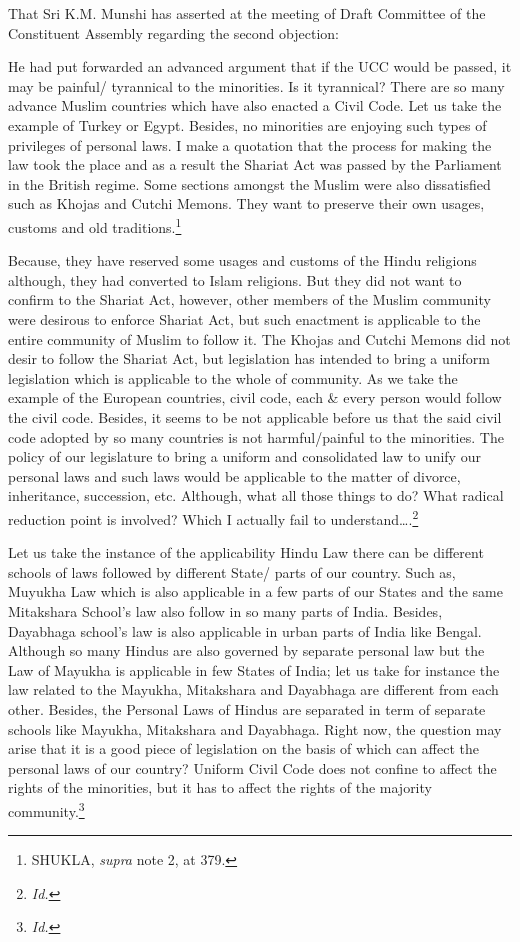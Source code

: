 \begin{multicols}{2}
\noi
That Sri K.M. Munshi has asserted at the meeting of Draft Committee of the Constituent
Assembly regarding the second objection: 

\noi
He had put forwarded an advanced argument that if the UCC would be passed, it may be
painful/ tyrannical to the minorities. Is it tyrannical? There are so many advance Muslim
countries which have also enacted a Civil Code. Let us take the example of Turkey or Egypt.
Besides, no minorities are enjoying such types of privileges of personal laws. I make a
quotation that the process for making the law took the place and as a result the Shariat Act
was passed by the Parliament in the British regime. Some sections amongst the Muslim were
also dissatisfied such as Khojas and Cutchi Memons. They want to preserve their own
usages, customs and old traditions.\footnote{SHUKLA, {\it supra} note 2, at 379.}

\noi
Because, they have reserved some usages and customs of the Hindu religions although, they
had converted to Islam religions. But they did not want to confirm to the Shariat Act,
however, other members of the Muslim community were desirous to enforce Shariat Act, but
such enactment is applicable to the entire community of Muslim to follow it. The Khojas and
Cutchi Memons did not desir to follow the Shariat Act, but legislation has intended to
bring a uniform legislation which is applicable to the whole of community. As we take the
example of the European countries, civil code, each \& every person would follow the civil
code. Besides, it seems to be not applicable before us that the said civil code adopted by so
many countries is not harmful/painful to the minorities. The policy of our legislature to bring
a uniform and consolidated law to unify our personal laws and such laws would be
applicable to the matter of divorce, inheritance, succession, etc. Although, what all those things to do? What radical reduction point is involved? Which I actually fail to
understand….\footnote{\it Id.} 

\noi
Let us take the instance of the applicability Hindu Law there can be different schools of
laws followed by different State/ parts of our country. Such as, Muyukha Law which is also
applicable in a few parts of our States and the same Mitakshara School’s law also follow in
so many parts of India. Besides, Dayabhaga school’s law is also applicable in urban parts of
India like Bengal. Although so many Hindus are also governed by separate personal law but
the Law of Mayukha is applicable in few States of India; let us take for instance the law
related to the Mayukha, Mitakshara and Dayabhaga are different from each other. Besides,
the Personal Laws of Hindus are separated in term of separate schools like Mayukha,
Mitakshara and Dayabhaga. Right now, the question may arise that it is a good piece of
legislation on the basis of which can affect the personal laws of our country? Uniform Civil
Code does not confine to affect the rights of the minorities, but it has to affect the rights of
the majority community.\footnote{\it Id.}


\end{multicols}
